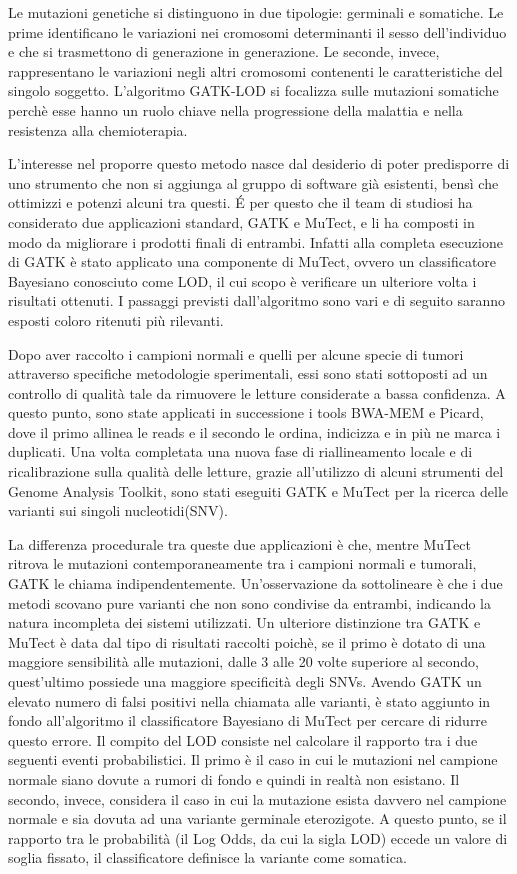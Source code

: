 Le mutazioni genetiche si distinguono in due tipologie: germinali e somatiche. Le prime identificano le variazioni nei cromosomi determinanti il sesso dell'individuo e che si trasmettono di generazione in generazione. Le seconde, invece, rappresentano le variazioni negli altri cromosomi contenenti le caratteristiche del singolo soggetto. 
L'algoritmo GATK-LOD si focalizza sulle mutazioni somatiche perchè esse hanno un ruolo chiave nella progressione della malattia e nella resistenza alla chemioterapia.

L'interesse nel proporre questo metodo nasce dal desiderio di poter predisporre di uno strumento che non si aggiunga al gruppo di software già esistenti, bensì che ottimizzi e potenzi alcuni tra questi.
\'E per questo che il team di studiosi ha considerato due applicazioni standard, GATK e MuTect, e li ha composti in modo da migliorare i prodotti finali di entrambi.
Infatti alla completa esecuzione di GATK è stato applicato una componente di MuTect, ovvero un classificatore Bayesiano conosciuto come LOD, il cui scopo è verificare un ulteriore volta i risultati ottenuti.
I passaggi previsti dall'algoritmo sono vari e di seguito saranno esposti coloro ritenuti più rilevanti.

Dopo aver raccolto i campioni normali e quelli per alcune specie di tumori attraverso specifiche metodologie sperimentali, essi sono stati sottoposti ad un controllo di qualità tale da rimuovere le letture considerate a bassa confidenza.
A questo punto, sono state applicati in successione i tools BWA-MEM e Picard, dove il primo allinea le reads e il secondo le ordina, indicizza e in più ne marca i duplicati.
Una volta completata una nuova fase di riallineamento locale e di ricalibrazione sulla qualità delle letture, grazie all'utilizzo di alcuni strumenti del Genome Analysis Toolkit, sono stati eseguiti GATK e MuTect per la ricerca delle varianti sui singoli nucleotidi(SNV).

La differenza procedurale tra queste due applicazioni è che, mentre MuTect ritrova le mutazioni contemporaneamente tra i campioni normali e tumorali, GATK le chiama indipendentemente.
Un'osservazione da sottolineare è che i due metodi scovano pure varianti che non sono condivise da entrambi, indicando la natura incompleta dei sistemi utilizzati.
Un ulteriore distinzione tra GATK e MuTect è data dal tipo di risultati raccolti poichè, se il primo è dotato di una maggiore sensibilità alle mutazioni, dalle 3 alle 20 volte superiore al secondo, quest'ultimo possiede una maggiore specificità degli SNVs.
Avendo GATK un elevato numero di falsi positivi nella chiamata alle varianti, è stato aggiunto in fondo all'algoritmo il classificatore Bayesiano di MuTect per cercare di ridurre questo errore.
Il compito del LOD consiste nel calcolare il rapporto tra i due seguenti eventi probabilistici.
Il primo è il caso in cui le mutazioni nel campione normale siano dovute a rumori di fondo e quindi in realtà non esistano.
Il secondo, invece, considera il caso in cui la mutazione esista davvero nel campione normale e sia dovuta ad una variante germinale eterozigote.
A questo punto, se il rapporto tra le probabilità (il Log Odds, da cui la sigla LOD) eccede un valore di soglia fissato, il classificatore definisce la variante come somatica.

